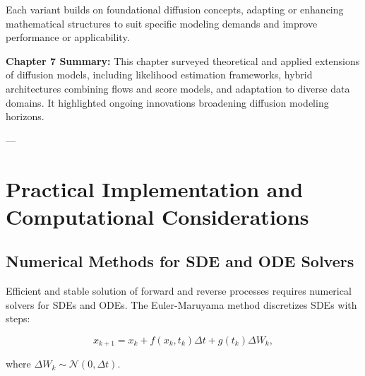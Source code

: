 \documentclass[a4paper,12pt,oneside]{memoir}
\begin{document}
\begin{table}[h]
\centering
{}
\caption{Comparative Overview of Advanced Diffusion Model Variants}
\end{table}

Each variant builds on foundational diffusion concepts, adapting or enhancing mathematical structures to suit specific modeling demands and improve performance or applicability.

\textbf{Chapter 7 Summary:}  
This chapter surveyed theoretical and applied extensions of diffusion models, including likelihood estimation frameworks, hybrid architectures combining flows and score models, and adaptation to diverse data domains. It highlighted ongoing innovations broadening diffusion modeling horizons.

---

\chapter{Practical Implementation and Computational Considerations}

\section{Numerical Methods for SDE and ODE Solvers}

Efficient and stable solution of forward and reverse processes requires numerical solvers for SDEs and ODEs. The Euler-Maruyama method discretizes SDEs with steps:

\[
x_{k+1} = x_k + f(x_k, t_k) \Delta t + g(t_k) \Delta W_k,
\]

where \( \Delta W_k \sim \mathcal{N}(0, \Delta t) \).
\end{document}
